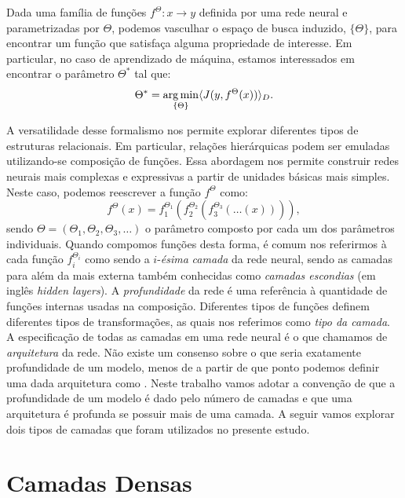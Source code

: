 Dada uma família de funções $f^{\Theta} : x \rightarrow y$ definida por uma rede neural e parametrizadas por $\Theta$, podemos vasculhar o espaço de busca induzido, $\{\Theta\}$, para encontrar um função que satisfaça alguma propriedade de interesse. Em particular, no caso de aprendizado de máquina, estamos interessados em encontrar o parâmetro $\Theta^*$ tal que:
\begin{equation}\label{thetaotimo}
\Theta^* = \operatorname*{arg\,min}_{\{\Theta\}} \langle J(y, f^{\Theta}(x)) \rangle_{D}.
\end{equation} 

A versatilidade desse formalismo nos permite explorar diferentes tipos de estruturas relacionais. Em particular, relações hierárquicas podem ser emuladas utilizando-se composição de funções. Essa abordagem nos permite construir redes neurais mais complexas e expressivas a partir de unidades básicas mais simples. Neste caso, podemos reescrever a função $f^{\Theta}$ como:
\begin{equation}\label{fcamadas}
f^{\Theta}(x) = f_1^{\Theta_1}(f_2^{\Theta_2} (f_3^{\Theta_3}(\ldots(x))) ),
\end{equation}
sendo $\Theta = (\Theta_1, \Theta_2, \Theta_3, \ldots)$ o parâmetro composto por cada um dos parâmetros individuais.
Quando compomos funções desta forma, é comum nos referirmos à cada função $f_i^{\Theta_i}$ como sendo a $i$-\textit{ésima} \textit{camada} da rede neural, sendo as camadas para além da mais externa também conhecidas como \textit{camadas escondias} (em inglês \textit{hidden layers}). A \textit{profundidade} da rede é uma referência à quantidade de funções internas usadas na composição. Diferentes tipos de funções definem diferentes tipos de transformações, as quais nos referimos como \textit{tipo da camada}. A especificação de todas as camadas em uma rede neural é o que chamamos de \textit{arquitetura} da rede. Não existe um consenso sobre o que seria exatamente profundidade de um modelo, menos de a partir de que ponto podemos definir uma dada arquitetura como \cite{Goodfellow-et-al-2016}. Neste trabalho vamos adotar a convenção de que a profundidade de um modelo é dado pelo número de camadas e que uma arquitetura é profunda se possuir mais de uma camada. A seguir vamos explorar dois tipos de camadas que foram utilizados no presente estudo.

\section{Camadas Densas}

